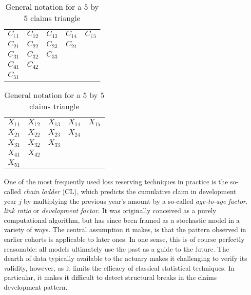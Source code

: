 \documentclass[a4paper]{book}
\begin{document}
\begin{table}
  \centering
  \begin{subtable}{0.45\textwidth}
    \centering
    \large
    \begin{tabular}{c c c c c}
      $C_{11}$ & $C_{12}$ & $C_{13}$ & $C_{14}$ & $C_{15}$ \\
      $C_{21}$ & $C_{22}$ & $C_{23}$ & $C_{24}$ &          \\
      $C_{31}$ & $C_{32}$ & $C_{33}$ &          &          \\
      $C_{41}$ & $C_{42}$ &          &          &          \\
      $C_{51}$ &          &          &          &
    \end{tabular}
  \end{subtable}
  \begin{subtable}{0.45\textwidth}
    \centering
    \large
    \begin{tabular}{c c c c c}
      $X_{11}$ & $X_{12}$ & $X_{13}$ & $X_{14}$ & $X_{15}$ \\
      $X_{21}$ & $X_{22}$ & $X_{23}$ & $X_{24}$ &          \\
      $X_{31}$ & $X_{32}$ & $X_{33}$ &          &          \\
      $X_{41}$ & $X_{42}$ &          &          &          \\
      $X_{51}$ &          &          &          &
    \end{tabular}
  \end{subtable}
  \caption{General notation for a 5 by 5 claims triangle}
\end{table}

One of the most frequently used loss reserving techniques in practice is the so-called \emph{chain ladder} (CL), which predicts the cumulative claim in development year $j$ by multiplying the previous year's amount by a so-called \emph{age-to-age factor}, \emph{link ratio} or \emph{development factor}. It was originally conceived as a purely computational algorithm, but has since been framed as a stochastic model in a variety of ways. The central assumption it makes, is that the pattern observed in earlier cohorts is applicable to later ones. In one sense, this is of course perfectly reasonable: all models ultimately use the past as a guide to the future. The dearth of data typically available to the actuary makes it challenging to verify its validity, however, as it limits the efficacy of classical statistical techniques. In particular, it makes it difficult to detect structural breaks in the claims development pattern.
\end{document}
